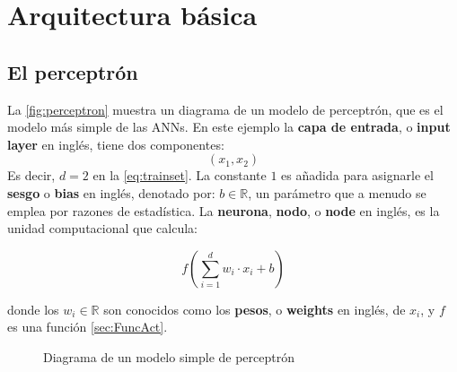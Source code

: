 \section{Arquitectura básica}

\subsection{El perceptrón}\label{sec:perceptron}

La \autoref{fig:perceptron} muestra un diagrama de un modelo de perceptrón, que es el modelo más simple de las \acs{ANN}s. En este ejemplo la \textbf{capa de entrada}, o \textbf{input layer} en inglés, tiene dos componentes:
$$(x_1,x_2)$$
Es decir, $d=2$ en la \autoref{eq:trainset}. La constante $1$ es añadida para asignarle el \textbf{sesgo} o \textbf{bias} en inglés, denotado por: $b \in \mathbb{R}$, un parámetro que a menudo se emplea por razones de estadística. La \textbf{neurona}, \textbf{nodo}, o \textbf{node} en inglés, es la unidad computacional que calcula:

\begin{equation}
  \label{eq:neuronfun}
  f\left( \sum_{i=1}^dw_i\cdot x_i + b \right)
\end{equation}

donde los $w_i \in \mathbb{R}$ son conocidos como los \textbf{pesos}, o \textbf{weights} en inglés, de $x_i$, y $f$ es una función \autoref{sec:FuncAct}.
\begin{figure}[hb]
  \centering

\caption{Diagrama de un modelo simple de perceptrón}
\label{fig:perceptron}
\end{figure}

